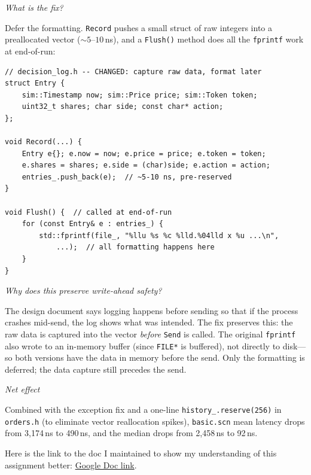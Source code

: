 \documentclass[11pt]{article}
\newcommand{\sq}[1]{\par\smallskip\noindent\textit{#1}\par\noindent\ignorespaces}
\begin{document}
\sq{What is the fix?}
Defer the formatting. \texttt{Record} pushes a small struct of raw integers into a preallocated vector (${\sim}5$--$10$\,ns), and a \texttt{Flush()} method does all the \texttt{fprintf} work at end-of-run:

\begin{lstlisting}
// decision_log.h -- CHANGED: capture raw data, format later
struct Entry {
    sim::Timestamp now; sim::Price price; sim::Token token;
    uint32_t shares; char side; const char* action;
};

void Record(...) {
    Entry e{}; e.now = now; e.price = price; e.token = token;
    e.shares = shares; e.side = (char)side; e.action = action;
    entries_.push_back(e);  // ~5-10 ns, pre-reserved
}

void Flush() {  // called at end-of-run
    for (const Entry& e : entries_) {
        std::fprintf(file_, "%llu %s %c %lld.%04lld x %u ...\n",
            ...);  // all formatting happens here
    }
}
\end{lstlisting}

\sq{Why does this preserve write-ahead safety?}
The design document says logging happens before sending so that if the process crashes mid-send, the log shows what was intended. The fix preserves this: the raw data is captured into the vector \emph{before} \texttt{Send} is called. The original \texttt{fprintf} also wrote to an in-memory buffer (since \texttt{FILE*} is buffered), not directly to disk---so both versions have the data in memory before the send. Only the formatting is deferred; the data capture still precedes the send.

\sq{Net effect}
Combined with the exception fix and a one-line \texttt{history\_.reserve(256)} in \texttt{orders.h} (to eliminate vector reallocation spikes), \texttt{basic.scn} mean latency drops from 3{,}174\,ns to 490\,ns, and the median drops from 2{,}458\,ns to 92\,ns.

\bigskip
Here is the link to the doc I maintained to show my understanding of this assignment better: \href{https://docs.google.com/document/d/1KtO2TB-vZZoZaDNBX_1GjSGEROhj7kQm0088NxLs2qo/edit?usp=sharing}{Google Doc link}.
\end{document}
